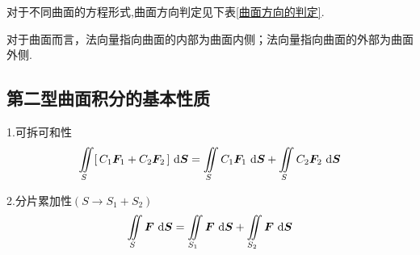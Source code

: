 \vspace*{-1em}

对于不同曲面的方程形式,曲面方向判定见下表\ref{曲面方向的判定}.
\begin{table}[!htb]
	\centering
	\caption{曲面方向的判定}
	\label{曲面方向的判定}
\end{table} 
\par 对于曲面而言，法向量指向曲面的内部为曲面内侧；法向量指向曲面的外部为曲面外侧.



\subsection{第二型曲面积分的基本性质}
\vspace*{-1em}

\theorem[第二型曲面积分的三个基本性质]
1.可拆可和性
\begin{equation}
	\iint\limits_{S}[\,C_1\bm{F}_1+C_2\bm{F}_2\,]\,\,{\rm{d}} \bm{S} =\iint\limits_{S}C_1\bm{F}_1\,\,{\rm{d}} \bm{S}  + \iint\limits_{S}C_2\bm{F}_2\,\,{\rm{d}} \bm{S} 
\end{equation}

\par 2.分片累加性$(S\rightarrow S_1+S_2)$
\begin{equation}
	\iint\limits_{S}\bm{F}\,\,{\rm{d}} \bm{S}  = \iint\limits_{S_1}\bm{F}\,\,{\rm{d}} \bm{S}  +\iint\limits_{S_2}\bm{F}\,\,{\rm{d}} \bm{S} 
\end{equation}

